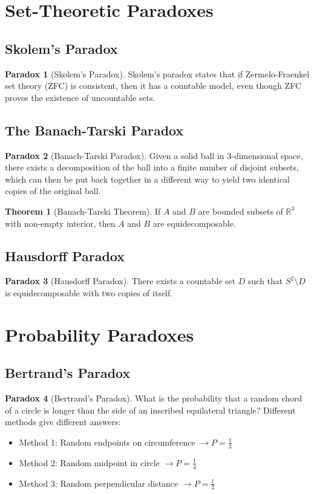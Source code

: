 \documentclass[11pt]{article}
\theoremstyle{definition}
\newtheorem{theorem}{Theorem}[section]
\newtheorem{paradox}{Paradox}[section]
\begin{document}
\section{Set-Theoretic Paradoxes}

\subsection{Skolem's Paradox}
\begin{paradox}[Skolem's Paradox]
Skolem's paradox states that if Zermelo-Fraenkel set theory (ZFC) is consistent, then it has a countable model, even though ZFC proves the existence of uncountable sets.
\end{paradox}

\subsection{The Banach-Tarski Paradox}
\begin{paradox}[Banach-Tarski Paradox]
Given a solid ball in 3-dimensional space, there exists a decomposition of the ball into a finite number of disjoint subsets, which can then be put back together in a different way to yield two identical copies of the original ball.
\end{paradox}

\begin{theorem}[Banach-Tarski Theorem]
If $A$ and $B$ are bounded subsets of $\mathbb{R}^3$ with non-empty interior, then $A$ and $B$ are equidecomposable.
\end{theorem}

\subsection{Hausdorff Paradox}
\begin{paradox}[Hausdorff Paradox]
There exists a countable set $D$ such that $S^2 \setminus D$ is equidecomposable with two copies of itself.
\end{paradox}

\section{Probability Paradoxes}

\subsection{Bertrand's Paradox}
\begin{paradox}[Bertrand's Paradox]
What is the probability that a random chord of a circle is longer than the side of an inscribed equilateral triangle? Different methods give different answers:
\begin{itemize}
    \item Method 1: Random endpoints on circumference $\rightarrow P = \frac{1}{3}$
    \item Method 2: Random midpoint in circle $\rightarrow P = \frac{1}{4}$
    \item Method 3: Random perpendicular distance $\rightarrow P = \frac{1}{2}$
\end{itemize}
\end{paradox}
\end{document}
